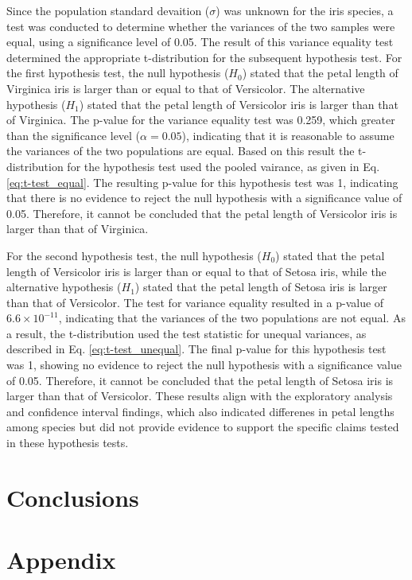 \documentclass{article}
\begin{document}
Since the population standard devaition ($\sigma$) was unknown for the iris species, a test was conducted to determine whether the variances of the two samples were equal, using a significance level of 0.05. The result of this variance equality test determined the appropriate t-distribution for the subsequent hypothesis test. For the first hypothesis test, the null hypothesis  ($H_0$) stated that the petal length of Virginica iris is larger than or equal to that of Versicolor. The alternative hypothesis ($H_1$) stated that the petal length of Versicolor iris is larger than that of Virginica. The p-value for the variance equality test was 0.259, which greater than the significance level ($\alpha = 0.05$), indicating that it is reasonable to assume the variances of the two populations are equal. Based on this result the t-distribution for the hypothesis test used the pooled vairance, as given in Eq. \ref{eq:t-test_equal}. The resulting p-value for this hypothesis test was 1, indicating that there is no evidence to reject the null hypothesis with a significance value of 0.05. Therefore, it cannot be concluded that the petal length of Versicolor iris is larger than that of Virginica.

 For the second hypothesis test, the null hypothesis ($H_0$) stated that the petal length of Versicolor iris is larger than or equal to that of Setosa iris, while the alternative hypothesis ($H_1$) stated that the petal length of Setosa iris is larger than that of Versicolor. The test for variance equality resulted in a p-value of $6.6\times10^{-11}$, indicating that the variances of the two populations are not equal. As a result, the t-distribution used the test statistic for unequal variances, as described in Eq. \ref{eq:t-test_unequal}. The final p-value for this hypothesis test was 1, showing no evidence to reject the null hypothesis with a significance value of 0.05. Therefore, it cannot be concluded that the petal length of Setosa iris is larger than that of Versicolor. These results align with the exploratory analysis and confidence interval findings, which also indicated differenes in petal lengths among species but did not provide evidence to support the specific claims tested in these hypothesis tests. 

\section{Conclusions}

\color{black}
\newpage
\section{Appendix}
\end{document}
